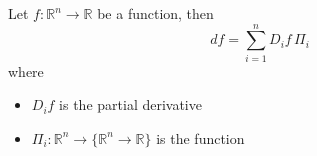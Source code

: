 \documentclass{article}
\begin{document}
    

    Let $f: \mathbb{R}^n \to \mathbb{R}$ be a function, then
    \[df = \sum_{i = 1}^n D_{i}f \, \Pi_{i}\]
    where 
    \begin{itemize}
        \item $D_{i}f$ is the partial derivative
        \item $\Pi_{i}: \mathbb{R}^n \to \{\mathbb{R}^n \to \mathbb{R}\}$
        is the function 
    \end{itemize}
\end{document}
